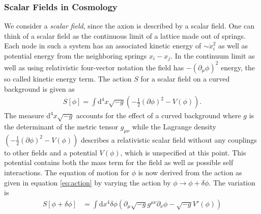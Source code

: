 \documentclass[twoside,a4paper, 12pt]{article}
\newcommand{\diff}{\mathrm{d}}
\numberwithin{equation}{section}
\begin{document}
\subsubsection{Scalar Fields in Cosmology}
We consider a \emph{scalar field}, since the axion is described by a scalar field.
One can think of a scalar field as the continuous limit of a lattice made out of springs.
Each node in such a system has an associated kinetic energy of $\sim \dot{x}_i^2$ as well as
potential energy from the neighboring springs $x_i - x_j$. In the continuum limit as well as using
relativistic four-vector notation the field has $- (\partial_\mu \phi)^2$ energy, the so called
kinetic energy term.
The action $S$ for a scalar field on a curved background is given \cite[Chap. 4.1, Page 25]{MarshAxionCosmo}
 as
\begin{align}
    \label{eq:action}
    S[\phi] = \int \diff^4 x \sqrt{-g} \left(- \frac{1}{2} (\partial \phi)^2 - V(\phi) \right).
\end{align}
The measure $\diff^4 x \sqrt{-g}$ accounts for the effect of a curved background where $g$ is the determinant of the metric tensor $g_{\mu \nu}$ while
the Lagrange density $ \left(- \frac{1}{2} (\partial \phi)^2 - V(\phi) \right)$ describes a relativistic scalar field without any couplings to other fields
and a potential $V(\phi)$, which is unspecified at this point.
This potential contains both the mass term for the field
as well as possible self interactions.
The equation of motion for $\phi$ is now derived from the action as given in equation \eqref{eq:action} by varying the action by $\phi \rightarrow \phi + \delta \phi$.
The variation is
\begin{align*}
    S[\phi + \delta \phi] %
    &= \int \diff  x^4 \delta \phi \left( \partial_\mu \sqrt{-g} g^{\mu \nu} \partial_\nu \phi - \sqrt{-g} V'(\phi) \right)
\end{align*}
\end{document}
